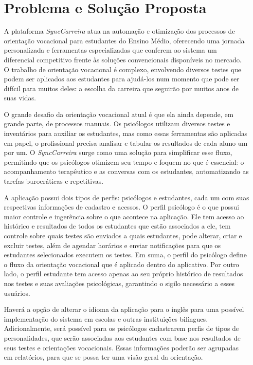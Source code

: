 \section{Problema e Solução Proposta}

A plataforma \textit{SyncCarreira} atua na automação e otimização dos processos de orientação vocacional para estudantes do Ensino Médio, oferecendo uma jornada personalizada e ferramentas especializadas que conferem ao sistema um diferencial competitivo frente às soluções convencionais disponíveis no mercado. O trabalho de orientação vocacional é complexo, envolvendo diversos testes que podem ser aplicados aos estudantes para ajudá-los num momento que pode ser difícil para muitos deles: a escolha da carreira que seguirão por muitos anos de suas vidas.

O grande desafio da orientação vocacional atual é que ela ainda depende, em grande parte, de processos manuais. Os psicólogos utilizam diversos testes e inventários para auxiliar os estudantes, mas como essas ferramentas são aplicadas em papel, o profissional precisa analisar e tabular os resultados de cada aluno um por um. O \textit{SyncCarreira} surge como uma solução para simplificar esse fluxo, permitindo que os psicólogos otimizem seu tempo e foquem no que é essencial: o acompanhamento terapêutico e as conversas com os estudantes, automatizando as tarefas burocráticas e repetitivas.

A aplicação possui dois tipos de perfis: psicólogos e estudantes, cada um com suas respectivas informações de cadastro e acessos. O perfil psicólogo é o que possui maior controle e ingerência sobre o que acontece na aplicação. Ele tem acesso ao histórico e resultados de todos os estudantes que estão associados a ele, tem controle sobre quais testes são enviados a quais estudantes, pode alterar, criar e excluir testes, além de agendar horários e enviar notificações para que os estudantes selecionados executem os testes. Em suma, o perfil do psicólogo define o fluxo da orientação vocacional que é aplicado dentro do aplicativo. Por outro lado, o perfil estudante tem acesso apenas ao seu próprio histórico de resultados nos testes e suas avaliações psicológicas, garantindo o sigilo necessário a esses usuários.

Haverá a opção de alterar o idioma da aplicação para o inglês para uma possível implementação do sistema em escolas e outras instituições bilíngues. Adicionalmente, será possível para os psicólogos cadastrarem perfis de tipos de personalidades, que serão associadas aos estudantes com base nos resultados de seus testes e orientações vocacionais. Essas informações poderão ser agrupadas em relatórios, para que se possa ter uma visão geral da orientação.

